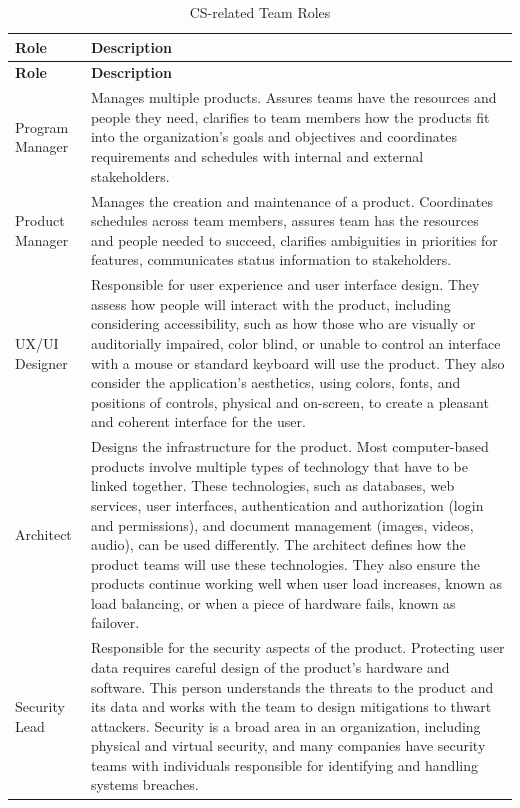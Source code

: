 \begin{longtable}[H]{p{.8in}|p{3.6in}}
	\caption{CS-related Team Roles}
	\label{tab:table1}\\
	\textbf{Role} & \textbf{Description}\\
	\hline
	\endfirsthead
	\textbf{Role} & \textbf{Description}\\
	\endhead
	\Tstrut Program Manager & Manages multiple products. Assures teams have the resources and people they need, clarifies to team members how the products fit into the organization's goals and objectives and coordinates requirements and schedules with internal and external stakeholders.\\
	\hline
	\Tstrut Product Manager & Manages the creation and maintenance of a product. Coordinates schedules across team members, assures team has the resources and people needed to succeed, clarifies ambiguities in priorities for features, communicates status information to stakeholders.\\
	\hline
	\Tstrut UX/UI \linebreak Designer & Responsible for user experience and user interface design. They assess how people will interact with the product, including considering accessibility, such as how those who are visually or auditorially impaired, color blind, or unable to control an interface with a mouse or standard keyboard will use the product. They also consider the application's aesthetics, using colors, fonts, and positions of controls, physical and on-screen, to create a pleasant and coherent interface for the user.\\
	\hline
	\Tstrut Architect & Designs the infrastructure for the product. Most computer-based products involve multiple types of technology that have to be linked together. These technologies, such as databases, web services, user interfaces, authentication and authorization (login and permissions), and document management (images, videos, audio), can be used differently. The architect defines how the product teams will use these technologies. They also ensure the products continue working well when user load increases, known as load balancing, or when a piece of hardware fails, known as failover.\\
	\hline
	\Tstrut Security Lead & Responsible for the security aspects of the product. Protecting user data requires careful design of the product's hardware and software. This person understands the threats to the product and its data and works with the team to design mitigations to thwart attackers. Security is a broad area in an organization, including physical and virtual security, and many companies have security teams with individuals responsible for identifying and handling systems breaches.\\

\end{longtable}

